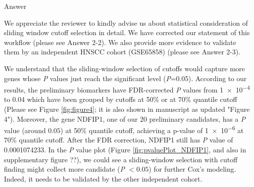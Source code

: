 \documentclass[preprint,12pt]{elsarticle}
\newenvironment{MyColorPar}[1]{%
    \leavevmode\color{#1}\ignorespaces%
}{%
}%
\begin{document}
%
\begin{MyColorPar}{blue}
Answer

We appreciate the reviewer to kindly advise us about statistical consideration of sliding window cutoff selection in detail.
We have corrected our statement of this workflow (please see Answer 2-2).
We also provide more evidence to validate them by an independent HNSCC cohort (GSE65858) (please see Answer 2-3).

We understand that the sliding-window selection of cutoffs would capture more genes whose \textit{P} values just reach the significant level (\textit{P}=0.05).
According to our results, the preliminary biomarkers have FDR-corrected \textit{P} values from \num{1e-4} to 0.04 which have been grouped by cutoffs at 50\% or at 70\% quantile cutoff (Please see Figure \ref{fig:figure4}; it is also shown in manuscript as updated "Figure 4").
Moreover, the gene NDFIP1, one of our 20 preliminary candidates, has a \textit{P} value (around $0.05$) at 50\% quantile cutoff, achieving a p-value of \num{1e-6} at 70\% quantile cutoff. After the FDR correction, NDFIP1 still has \textit{P} value of \num[3]{0.0001074233}.
In the \textit{P} value plot (Figure \ref{fig:pvaluePlot_NDFIP1}, and also in 
supplementary figure ??), we could see a sliding-window selection with cutoff finding might collect more candidate (\textit{P} $<0.05$) for further Cox's modeling.
Indeed, it needs to be validated by the other independent cohort.



\end{MyColorPar}
\end{document}
